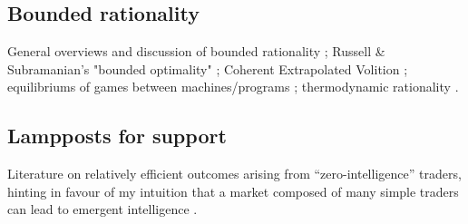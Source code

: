 \documentclass{article}
\begin{document}
\subsection*{Bounded rationality}
General overviews and discussion of bounded rationality \cite{simonModelsManSocial1957, gigerenzerBoundedRationalityAdaptive2002, gigerenzerRationalTheoryHeuristics2016, arrowBoundedRationalityUnboundedly2004}; Russell \& Subramanian's "bounded optimality" \cite{russellProvablyBoundedOptimalAgents1995, russellRationalityIntelligenceBrief2016}; Coherent Extrapolated Volition \cite{yudkowskyCoherentExtrapolatedVolition2004}; equilibriums of games between machines/programs \cite{halpernAlgorithmicRationalityGame2014, halpernDonWantThink2011, tennenholtzProgramEquilibrium2004, lewisComputationalRationalityLinking2014, zilbersteinMetareasoningBoundedRationality2011}; thermodynamic rationality \cite{ortegaInformationTheoreticBoundedRationality2015, ortegaInformationUtilityBounded2011, ortegaThermodynamicsTheoryDecisionmaking2013, gottwaldBoundedRationalDecisionMaking2019}.
\newrefcontext[labelprefix=BR]
\printbibliography[filter=br]

\subsection*{Lampposts for support}
Literature on relatively efficient outcomes arising from ``zero-intelligence'' traders, hinting in favour of my intuition that a market composed of many simple traders can lead to emergent intelligence \cite{godeAllocativeEfficiencyMarkets1993, godeWhatMakesMarkets1997, jamalSimpleAgentsIntelligent2015, laibsonSafetyMarketsImpossibility2007, schwartzHowMuchIrrationality2008}.
\newrefcontext[labelprefix=X]
\printbibliography[filter=lampposts]
\end{document}
